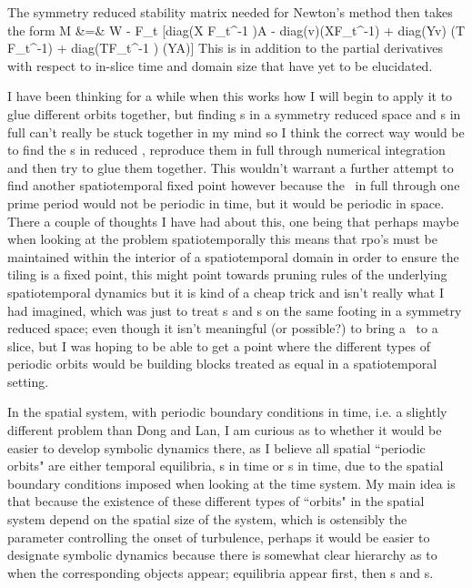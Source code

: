 The symmetry reduced stability matrix needed for Newton's method then takes the form
\bea
M &=& W - F_t [diag(X \cdot F_t^{-1} \cdot \Fu)\cdot A - diag(v)\cdot(X\cdot F_t^{-1})
    \ceq
+ diag(Y\cdot v) \cdot (T \cdot F_t^{-1})
+ diag(T\cdot F_t^{-1} \cdot \Fu) \cdot (Y\cdot A)]
\eea
This is in addition to the partial derivatives with respect to in-slice time
and domain size that have yet to be elucidated.

I have been thinking for a while when this works how I will begin to apply it to glue different orbits together,
but finding {\rpo}s in a symmetry reduced space and {\ppo}s in full {\statesp} can't really be stuck together
in my mind so I think the correct way would be to find the {\rpo}s in reduced {\statesp}, reproduce
them in full {\statesp} through numerical integration and then try to glue them together. This wouldn't
warrant a further attempt to find another spatiotemporal fixed point however because the \rpo\ in full
{\statesp} through one prime period would not be periodic in time, but it would be periodic in space.
There a couple of thoughts I have had about this, one being that perhaps maybe when looking at the
problem spatiotemporally this means that rpo's must be maintained within the interior of a spatiotemporal
domain in order to ensure the tiling is a fixed point, this might point towards pruning rules of the underlying
spatiotemporal dynamics but it is kind of a cheap trick and isn't really what I had imagined, which was just
to treat {\ppo}s and {\rpo}s on the same footing in a symmetry reduced space; even though it isn't meaningful
(or possible?) to bring a \ppo\ to a slice, but I was hoping to be able to get a point where the different types
of periodic orbits would be building blocks treated as equal in a spatiotemporal setting.

In the spatial system, with periodic boundary conditions in time, i.e. a
slightly different problem than Dong and Lan, I am curious as
to whether it would be easier to develop symbolic dynamics there, as I
believe all spatial ``periodic orbits" are either temporal equilibria,
{\ppo}s in time or {\rpo}s in time, due to the spatial boundary
conditions imposed when looking at the time system. My main idea is that
because the existence of these different types of ``orbits" in the
spatial system depend on the spatial size of the system, which is
ostensibly the parameter controlling the onset of turbulence, perhaps it
would be easier to designate symbolic dynamics because there is somewhat
clear hierarchy as to when the corresponding objects appear; equilibria
appear first, then {\ppo}s and {\rpo}s.

